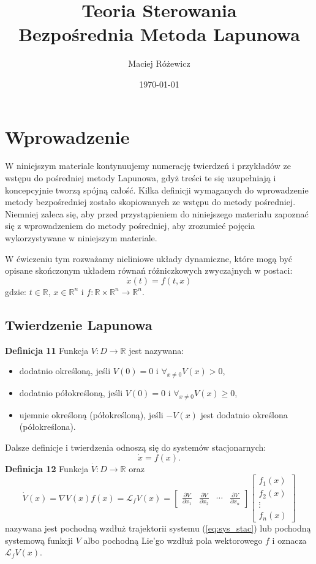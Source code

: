 \documentclass{article}
\title{
    Teoria Sterowania\\
    \Large Bezpośrednia Metoda Lapunowa
}
\author{Maciej Różewicz}
\date{\today}
\begin{document}
\maketitle

\newpage
\section{Wprowadzenie}

W niniejszym materiale kontynuujemy numerację twierdzeń i przykładów ze wstępu do pośredniej metody Lapunowa, gdyż treści te się uzupełniają i koncepcyjnie tworzą spójną całość.
Kilka definicji wymaganych do wprowadzenie metody bezpośredniej zostało skopiowanych ze wstępu do metody pośredniej. Niemniej zaleca się,
aby przed przystąpieniem do niniejszego materiału zapoznać się z wprowadzeniem do metody pośredniej, aby zrozumieć pojęcia wykorzystywane w niniejszym materiale.

W ćwiczeniu tym rozważamy nieliniowe układy dynamiczne, które mogą być opisane skończonym układem równań różniczkowych zwyczajnych w postaci:
\begin{equation}\label{eq:sys}
    \dot{x}(t) = f(t, x)
\end{equation}
gdzie: $t\in \mathbb{R}$, $x\in\mathbb{R}^{n}$ i $f: \mathbb{R} \times \mathbb{R}^{n} \rightarrow \mathbb{R}^{n}$.

\subsection{Twierdzenie Lapunowa}
\textbf{Definicja 11}
Funkcja $V: D \rightarrow \mathbb{R}$ jest nazywana:
\begin{itemize}
    \item dodatnio określoną, jeśli $V(0) = 0$ i $\forall_{x\neq 0}V(x) > 0$,
    \item dodatnio półokreśloną, jeśli $V(0) = 0$ i $\forall_{x\neq 0}V(x) \geq 0$,
    \item ujemnie określoną (półokreśloną), jeśli $-V(x)$ jest dodatnio określona (półokreślona).
\end{itemize}

Dalsze definicje i twierdzenia odnoszą się do systemów stacjonarnych:
\begin{equation}\label{eq:sys_stac}
    \dot{x} = f(x).
\end{equation}
\textbf{Definicja 12}
Funkcja $\dot{V}: D \rightarrow \mathbb{R}$ oraz 
$$
    \dot{V}(x)=\nabla V(x)f(x) = \mathcal{L}_{f}V(x) = \begin{bmatrix} \frac{\partial V}{\partial x_{1}} & \frac{\partial V}{\partial x_{2}} & \cdots & \frac{\partial V}{\partial x_{n}} \end{bmatrix}
    \begin{bmatrix} f_{1}(x) \\ f_{2}(x) \\ \vdots \\ f_{n}(x) \end{bmatrix}
$$
nazywana jest pochodną wzdłuż trajektorii systemu (\ref{eq:sys_stac}) lub pochodną systemową funkcji $V$ albo pochodną Lie'go wzdłuż pola wektorowego $f$ i oznacza $\mathcal{L}_{f}V(x)$.
\end{document}
